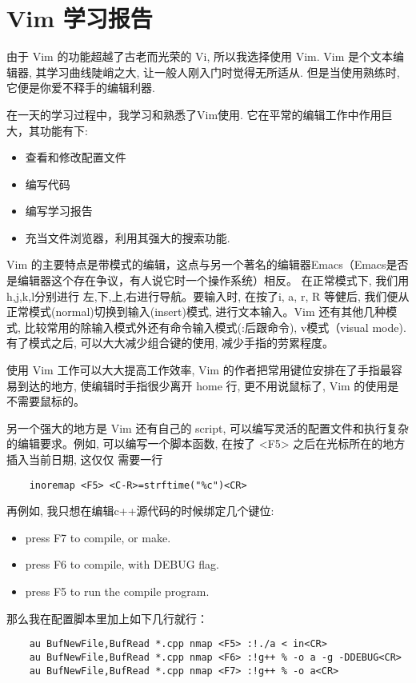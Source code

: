 \section{Vim 学习报告}

由于 Vim 的功能超越了古老而光荣的 Vi, 所以我选择使用 Vim. Vim 是个文本编辑器, 其学习曲线陡峭之大, 让一般人刚入门时觉得无所适从.
但是当使用熟练时, 它便是你爱不释手的编辑利器.

在一天的学习过程中，我学习和熟悉了Vim使用. 它在平常的编辑工作中作用巨大，其功能有下:

\begin{itemize}
\item 查看和修改配置文件
\item 编写代码
\item 编写学习报告
\item 充当文件浏览器，利用其强大的搜索功能.
\end{itemize}

Vim 的主要特点是带模式的编辑，这点与另一个著名的编辑器Emacs（Emacs是否是编辑器这个存在争议，有人说它时一个操作系统）相反。 在正常模式下, 我们用h,j,k,l分别进行
左,下,上,右进行导航。要输入时, 在按了i, a, r, R 等健后, 我们便从正常模式(normal)切换到输入(insert)模式, 进行文本输入。Vim 还有其他几种模式, 比较常用的除输入模式外还有命令输入模式(:后跟命令), v模式（visual mode).
有了模式之后, 可以大大减少组合键的使用, 减少手指的劳累程度。

使用 Vim 工作可以大大提高工作效率, Vim 的作者把常用键位安排在了手指最容易到达的地方, 使编辑时手指很少离开 home 行, 更不用说鼠标了, Vim 的使用是不需要鼠标的。

另一个强大的地方是 Vim 还有自己的 script, 可以编写灵活的配置文件和执行复杂的编辑要求。例如, 可以编写一个脚本函数, 在按了 <F5> 之后在光标所在的地方插入当前日期, 这仅仅
需要一行
\begin{verbatim}
    inoremap <F5> <C-R>=strftime("%c")<CR>
\end{verbatim}
再例如, 我只想在编辑c++源代码的时候绑定几个键位: 
\begin{itemize}
\item press F7 to compile, or make.
\item press F6 to compile, with DEBUG flag.
\item press F5 to run the compile program.
\end{itemize}
那么我在配置脚本里加上如下几行就行：

\begin{verbatim}
    au BufNewFile,BufRead *.cpp nmap <F5> :!./a < in<CR>
    au BufNewFile,BufRead *.cpp nmap <F6> :!g++ % -o a -g -DDEBUG<CR>
    au BufNewFile,BufRead *.cpp nmap <F7> :!g++ % -o a<CR>
\end{verbatim}

